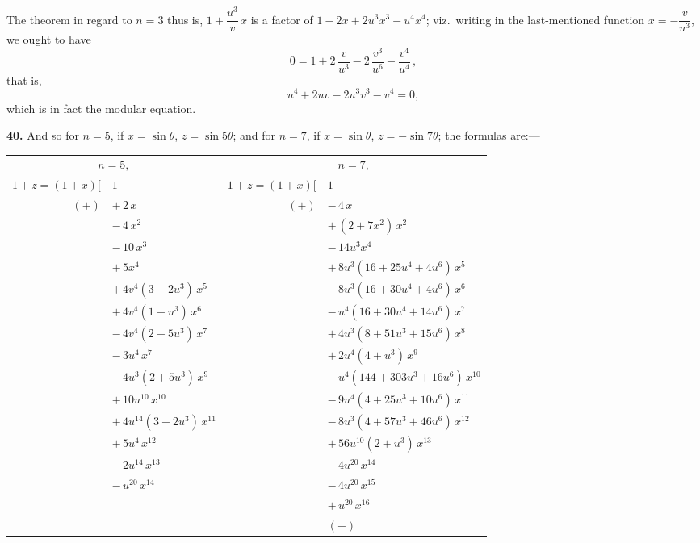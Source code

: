 \documentclass[11pt]{article}
\begin{document}
The theorem in regard to $n=3$ thus is, $1+\dfrac{u^3}{v}\,x$ is a factor of
$1 - 2x + 2u^3 x^3 - u^4 x^4$; viz.\ writing in the last-mentioned function $x=-\dfrac{v}{u^3}$,
we ought to have
\[
0 = 1 + 2\,\frac{v}{u^3} - 2\,\frac{v^3}{u^6} - \frac{v^4}{u^4}\,,
\]
that is,
\[
u^4 + 2uv - 2u^3 v^3 - v^4 = 0,
\]
which is in fact the modular equation.

\medskip

\textbf{40.} And so for $n=5$, if $x=\sin\theta$, $z=\sin 5\theta$; and for $n=7$, if $x=\sin\theta$,
$z=-\sin 7\theta$; the formulas are:---

\medskip

\begin{center}
\begin{tabular}{rl|rl}
\multicolumn{2}{c|}{$n=5,$} & \multicolumn{2}{c}{$n=7,$}\\[2pt]
$1+z = (1+x)\bigl[$ & $1$ & $1+z = (1+x)\bigl[$ & $1$\\
$(+)$ & $+\,2\,x$ & $(+)$ & $-\,4\,x$\\
& $-\,4\,x^2$ & & $+\,(2+7x^2)\,x^2$\\
& $-\,10\,x^3$ & & $-\,14u^3 x^4$\\
& $+\,5x^4$ & & $+\,8u^3(16+25u^4+4u^6)\,x^5$\\
& $+\,4v^4(3+2u^3)\,x^5$ & & $-\,8u^3(16+30 u^4+4u^6)\,x^6$\\
& $+\,4v^4(1-u^3)\,x^6$ & & $-\,u^4(16+30 u^4+14 u^6)\,x^7$\\
& $-\,4v^4(2+5u^3)\,x^7$ & & $+\,4u^3(8+51u^3+15u^6)\,x^8$\\
& $-\,3u^4\,x^7$ & & $+\,2u^4(4+u^3)\,x^9$\\
& $-\,4u^3(2+5u^3)\,x^9$ & & $-\,u^4(144+303 u^3+16 u^6)\,x^{10}$\\
& $+\,10u^{10}\,x^{10}$ & & $-\,9u^4(4+25u^3+10u^6)\,x^{11}$\\
& $+\,4u^{14}(3+2u^3)\,x^{11}$ & & $-\,8u^3(4+57u^3+46u^6)\,x^{12}$\\
& $+\,5u^4\,x^{12}$ & & $+\,56u^{10}(2+u^3)\,x^{13}$\\
& $-\,2u^{14}\,x^{13}$ & & $-\,4u^{20}\,x^{14}$\\
& $-\,u^{20}\,x^{14}$ & & $-\,4u^{20}\,x^{15}$\\
& & & $+\,u^{20}\,x^{16}$\\
& & & $(+)$\\
\end{tabular}
\end{center}

\bigskip
\end{document}
